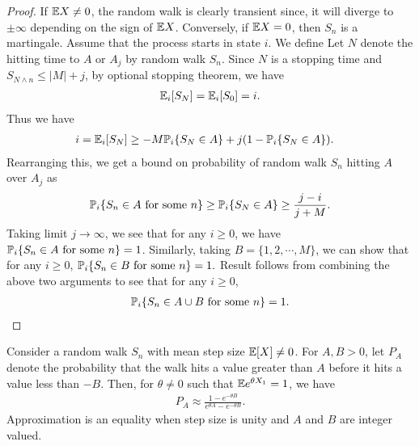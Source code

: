 \documentclass[a4paper,10pt,english]{article}
\begin{document}
\begin{proof}
If $\E X \neq 0$, the random walk is clearly transient since, it will diverge to $\pm \infty$ depending on the sign of $\E X$. 
Conversely, if $\E X =0$, then $S_n$ is a martingale. 
Assume that the process starts in state $i$. 
We define
Let $N$ denote the hitting time to $A$ or $A_j$ by random walk $S_n$. 
Since $N$ is a stopping time and $S_{N\wedge n} \leq |M|+j$, by optional stopping theorem, we have
\begin{align*}
\E_i[S_N] =\E_i[S_0] = i.
\end{align*}
Thus we have
\begin{align*}
i &= \E_i[S_N] %
\geq -M\P_i\{S_N \in A\} + j(1-\P_i\{S_N \in A\}). 
\end{align*}
Rearranging this, we get a bound on probability of random walk $S_n$ hitting $A$ over $A_j$ as 
\begin{align*}
\P_i\{S_n \in A \text{ for some } n\} \geq \P_i\{S_N \in A\} \geq \frac{j-i}{j+M}.
\end{align*}
Taking limit $j \to \infty$, we see that for any $i \geq 0$, we have 
$\P_i\{S_n \in A \text{ for some }n \} = 1$.
Similarly, taking $B = \{1,2,\cdots, M\}$, we can show that for any $i \geq 0$, 
$\P_i\{S_n \in B \text{ for some }n \} = 1.$
Result follows from combining the above two arguments to see that for any $i \geq 0$,
\begin{align*}
\P_i\{S_n \in A\cup B \text{ for some } n\} = 1.
\end{align*}
\end{proof}
\begin{prop} 
Consider a random walk $S_n$ with mean step size $\E[X] \neq 0$. 
For $A,B > 0$, let $P_A$ denote the probability that the walk hits a value greater than $A$ before it hits a value less than $-B$. 
Then, for $\theta \neq 0$ such that $\E e^{\theta X_1} = 1$, we have
\begin{align*}
P_A \approx \frac{1-e^{-\theta B}}{e^{\theta A}-e^{-\theta B}}.
\end{align*}
Approximation is an equality when step size is unity and $A$ and $B$ are integer valued.
\end{prop}
\end{document}
